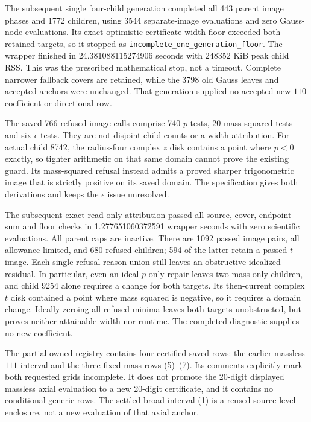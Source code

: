 \documentclass[10pt]{article}
\begin{document}
The subsequent single four-child generation completed all
443 parent image phases and 1772 children, using 3544
separate-image evaluations and zero Gauss-node evaluations.
Its exact optimistic certificate-width floor exceeded both
retained targets, so it stopped as
\texttt{incomplete\_one\_generation\_floor}.
The wrapper finished in 24.381088115274906 seconds with
248352 KiB peak child RSS. This was the prescribed mathematical
stop, not a timeout. Complete narrower fallback covers are
retained, while the 3798 old Gauss leaves and accepted anchors
were unchanged. That generation supplied no accepted new
$110$ coefficient or directional row.

The saved 766 refused image calls comprise 740 $p$ tests,
20 mass-squared tests and six $\epsilon$ tests. They are
not disjoint child counts or a width attribution.
For actual child 8742, the radius-four complex $z$ disk
contains a point where $p<0$ exactly, so tighter arithmetic
on that same domain cannot prove the existing guard.
Its mass-squared refusal instead admits a proved sharper
trigonometric image that is strictly positive on its saved
domain. The specification gives both derivations and keeps
the $\epsilon$ issue unresolved.

The subsequent exact read-only attribution passed all source,
cover, endpoint-sum and floor checks in 1.277651060372591
wrapper seconds with zero scientific evaluations. All parent
caps are inactive. There are 1092 passed image pairs, all
allowance-limited, and 680 refused children; 594 of the latter
retain a passed $t$ image. Each single refusal-reason union
still leaves an obstructive idealized residual. In particular,
even an ideal $p$-only repair leaves two mass-only children,
and child 9254 alone requires a change for both targets.
Its then-current complex $t$ disk contained a point where mass
squared is negative, so it requires a domain change.
Ideally zeroing all refused minima leaves both targets
unobstructed, but proves neither attainable width nor runtime.
The completed diagnostic supplies no new coefficient.

The partial owned registry
contains four certified saved rows: the earlier massless $111$
interval and the three fixed-mass rows (5)--(7). Its comments explicitly
mark both requested grids incomplete. It does not promote the
20-digit displayed massless axial evaluation to a new 20-digit
certificate, and it contains no conditional generic rows.
The settled broad interval (1) is a reused source-level enclosure,
not a new evaluation of that axial anchor.
\end{document}
